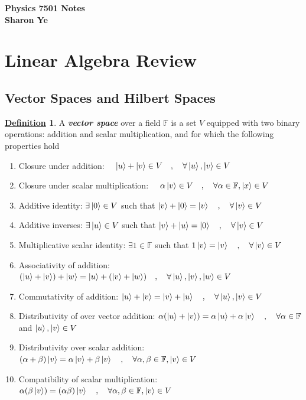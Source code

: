 \documentclass[11pt, answers]{exam}
\theoremstyle{definition}
\newtheorem{definition}{\underline{Definition}}[section]
\theoremstyle{bulleted}
\begin{document}
	\begin{center}
		\Large \bf Physics 7501 Notes \\  Sharon Ye
	\end{center}
	
	\section{Linear Algebra Review}
	\subsection{Vector Spaces and Hilbert Spaces}
	\begin{definition}
		A \textbf{\textit{vector space}} over a field $\mathbb{F}$ is a set $V$ equipped with two binary operations: addition and scalar multiplication, and for which the following properties hold
		\begin{enumerate}[label=(\arabic*)]
			\item Closure under addition: $\quad \ket{u}+\ket{v}\in V\quad,\quad \forall \ket{u},\ket{v}\in V$
			\item Closure under scalar multiplication: $\quad\alpha \ket{v}\in V\quad,\quad \forall \alpha\in\mathbb{F}, \ket{x}\in V$
			\item Additive identity: $\exists \ket{0}\in V$ such that $\ket{v}+\ket{0}=\ket{v}\quad,\quad \forall \ket{v}\in V$
			\item Additive inverses: $\exists \ket{u}\in V$ such that $\ket{v} + \ket{u} = \ket{0}\quad,\quad \forall \ket{v}\in V$
			\item Multiplicative scalar identity: $\exists 1\in\mathbb{F}$ such that $1\ket{v}=\ket{v}\quad,\quad\forall \ket{v}\in V$
			\item Associativity of addition: $(|u\rangle+|v\rangle)+|w\rangle
			=|u\rangle+(|v\rangle+|w\rangle)\quad,\quad \forall\ket{u},\ket{v},\ket{w}\in V$
			\item Commutativity of addition: $\ket{u}+\ket{v}=\ket{v}+\ket{u}\quad,\quad \forall\ket{u},\ket{v}\in V$
			\item Distributivity of over vector addition: $\alpha(\ket{u}+\ket{v})=\alpha\ket{u}+\alpha\ket{v}\quad,\quad\forall \alpha\in \mathbb{F}$ and $\ket{u},\ket{
			v}\in V$
			\item Distributivity over scalar addition: $(\alpha + \beta)\ket{v} = \alpha\ket{v}+\beta\ket{v}\quad,\quad \forall \alpha,\beta\in\mathbb{F}, \ket{v}\in V$ 
			\item Compatibility of scalar multiplication: $\alpha(\beta\ket{v}) = (\alpha\beta)\ket{v}\quad,\quad \forall \alpha,\beta\in\mathbb{F}, \ket{v}\in V$
		\end{enumerate}
	\end{definition}
\end{document}
